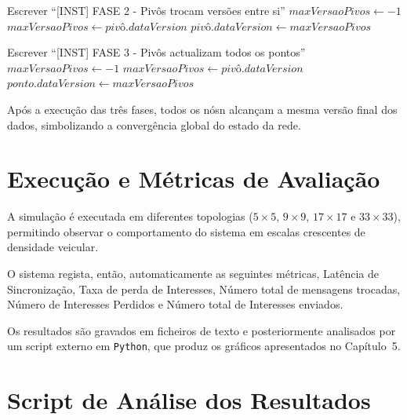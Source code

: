 \begin{algorithm}[H]
\caption{Fase 2 – Inter-sincronização entre Pivôs}
\begin{algorithmic}[1]
\State Escrever ``[INST] FASE 2 - Pivôs trocam versões entre si''
\State $maxVersaoPivos \gets -1$
        \State $maxVersaoPivos \gets pivô.dataVersion$
    \EndIf
\EndFor
{}
    \State $pivô.dataVersion \gets maxVersaoPivos$
\EndFor
\end{algorithmic}
\end{algorithm}

\begin{algorithm}[H]
\caption{Fase 3 – Disseminação dos Pivôs para os Pontos}
\begin{algorithmic}[1]
\State Escrever ``[INST] FASE 3 - Pivôs actualizam todos os pontos''
\State $maxVersaoPivos \gets -1$
        \State $maxVersaoPivos \gets pivô.dataVersion$
    \EndIf
\EndFor
{}
    \State $ponto.dataVersion \gets maxVersaoPivos$
\EndFor
\end{algorithmic}
\end{algorithm}

Após a execução das três fases, todos os nósn alcançam a mesma versão final dos dados, simbolizando a convergência global do estado da rede.

\section{Execução e Métricas de Avaliação}

A simulação é executada em diferentes topologias ($5\times5$, $9\times9$, $17\times17$ e $33\times33$), permitindo observar o comportamento do sistema em escalas crescentes de densidade veicular. 

O sistema regista, então, automaticamente as seguintes métricas, Latência de Sincronização, Taxa de perda de Interesses, Número total de mensagens trocadas, Número de Interesses Perdidos e Número total de Interesses enviados.

Os resultados são gravados em ficheiros de texto e posteriormente analisados por um script externo em \texttt{Python}, que produz os gráficos apresentados no Capítulo~5.


\section{Script de Análise dos Resultados}

